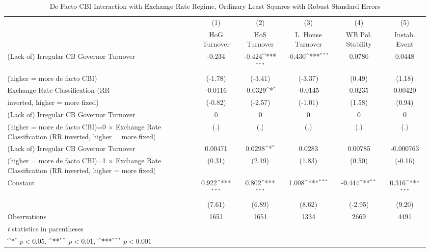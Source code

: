 \begin{table}[htbp]\centering
\def\sym#1{\ifmmode^{#1}\else\(^{#1}\)\fi}
\caption{De Facto CBI Interaction with Exchange Rate Regime, Ordinary Least Squares with Robust Standard Errors \label{imultIndOLSDF}}
\begin{tabular}{l*{5}{c}}
\toprule
                                        &\multicolumn{1}{c}{(1)}&\multicolumn{1}{c}{(2)}&\multicolumn{1}{c}{(3)}&\multicolumn{1}{c}{(4)}&\multicolumn{1}{c}{(5)}\\
                                        &\multicolumn{1}{c}{HoG Turnover}&\multicolumn{1}{c}{HoS Turnover}&\multicolumn{1}{c}{L. House Turnover}&\multicolumn{1}{c}{WB Pol. Stability}&\multicolumn{1}{c}{Instab. Event}\\
\midrule
(Lack of) Irregular CB Governor Turnover&   -0.234         &   -0.424\sym{***}&   -0.430\sym{***}&   0.0780         &   0.0448         \\
(higher = more de facto CBI)            &  (-1.78)         &  (-3.41)         &  (-3.37)         &   (0.49)         &   (1.18)         \\
\addlinespace
Exchange Rate Classification (RR        &  -0.0116         &  -0.0329\sym{*}  &  -0.0145         &   0.0235         &  0.00420         \\
inverted, higher = more fixed)          &  (-0.82)         &  (-2.57)         &  (-1.01)         &   (1.58)         &   (0.94)         \\
\addlinespace
(Lack of) Irregular CB Governor Turnover&        0         &        0         &        0         &        0         &        0         \\
(higher = more de facto CBI)=0 $\times$ Exchange Rate Classification (RR inverted, higher = more fixed)&      (.)         &      (.)         &      (.)         &      (.)         &      (.)         \\
\addlinespace
(Lack of) Irregular CB Governor Turnover&  0.00471         &   0.0298\sym{*}  &   0.0283         &  0.00785         &-0.000763         \\
(higher = more de facto CBI)=1 $\times$ Exchange Rate Classification (RR inverted, higher = more fixed)&   (0.31)         &   (2.19)         &   (1.83)         &   (0.50)         &  (-0.16)         \\
\addlinespace
Constant                                &    0.922\sym{***}&    0.802\sym{***}&    1.008\sym{***}&   -0.444\sym{**} &    0.316\sym{***}\\
                                        &   (7.61)         &   (6.89)         &   (8.62)         &  (-2.95)         &   (9.20)         \\
\midrule
Observations                            &     1651         &     1651         &     1334         &     2669         &     4491         \\
\bottomrule
\multicolumn{6}{l}{\footnotesize \textit{t} statistics in parentheses}\\
\multicolumn{6}{l}{\footnotesize \sym{*} \(p<0.05\), \sym{**} \(p<0.01\), \sym{***} \(p<0.001\)}\\
\end{tabular}
\end{table}
